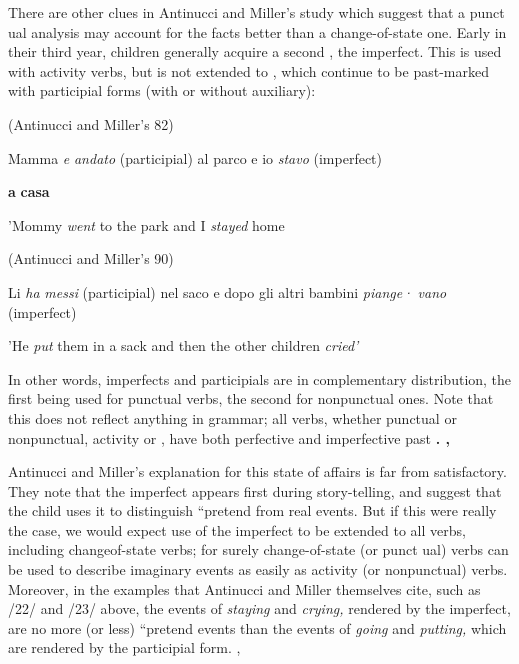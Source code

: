 There are other clues in Antinucci and Miller's study which 
suggest that a punct ual analysis may account for the facts better than a change-of-state one. Early in their third year,  children gener\-ally acquire a second  , the imperfect. This is used with activity verbs, but is not extended to , which continue to be past-marked with participial forms (with or without auxiliary):

\ea\label{ex:22}
 (Antinucci and Miller's 82)
\glt
\z

Mamma \textit{e} \textit{andato} (participial) al parco e io \textit{stavo} (imperfect)

\textbf{a} \textbf{casa}

'Mommy \textit{went} to the park and I \textit{stayed} home

\ea\label{ex:23}
 (Antinucci and Miller's 90)
\glt
\z

Li \textit{ha} \textit{messi }(participial) nel saco e dopo gli altri bambini \textit{piange·} \textit{vano }(imperfect)

'He \textit{put} them in a sack and then the other children \textit{cried'}

In other words, imperfects and participials are in complementary distribution, the first being used for punctual verbs, the second for nonpunctual ones. Note that this does not reflect anything in  grammar; all  verbs, whether punctual or nonpunctual, activity or , have both perfective and imperfective past \textbf{. ,}

Antinucci and Miller's explanation for this state of affairs is far from satisfactory. They note that the imperfect appears first during story-telling, and suggest that the child uses it to distinguish ``pretend from real events. But if this were really the case, we would expect use of the imperfect to be extended to all  verbs, including change\-of-state verbs; for surely change-of-state (or punct ual) verbs can be used to describe imaginary events as easily as activity (or nonpunctual) verbs. Moreover, in the examples that Antinucci and Miller them\-selves cite, such as /22/ and /23/ above, the events of \textit{staying }and \textit{crying,} rendered by the imperfect, are no more (or less) ``pretend events than the events of \textit{going} and \textit{putting, }which are rendered by the participial form. ,

